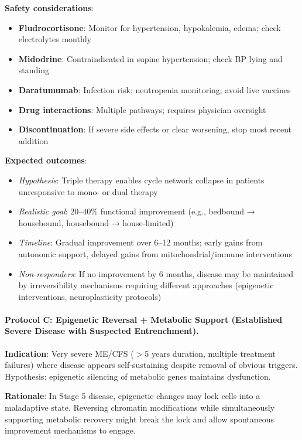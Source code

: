 \textbf{Safety considerations}:
\begin{itemize}
    \item \textbf{Fludrocortisone}: Monitor for hypertension, hypokalemia, edema; check electrolytes monthly
    \item \textbf{Midodrine}: Contraindicated in supine hypertension; check BP lying and standing
    \item \textbf{Daratumumab}: Infection risk; neutropenia monitoring; avoid live vaccines
    \item \textbf{Drug interactions}: Multiple pathways; requires physician oversight
    \item \textbf{Discontinuation}: If severe side effects or clear worsening, stop most recent addition
\end{itemize}

\textbf{Expected outcomes}:
\begin{itemize}
    \item \textit{Hypothesis}: Triple therapy enables cycle network collapse in patients unresponsive to mono- or dual therapy
    \item \textit{Realistic goal}: 20--40\% functional improvement (e.g., bedbound → housebound, housebound → house-limited)
    \item \textit{Timeline}: Gradual improvement over 6--12 months; early gains from autonomic support, delayed gains from mitochondrial/immune interventions
    \item \textit{Non-responders}: If no improvement by 6 months, disease may be maintained by irreversibility mechanisms requiring different approaches (epigenetic interventions, neuroplasticity protocols)
\end{itemize}

\paragraph{Protocol C: Epigenetic Reversal + Metabolic Support (Established Severe Disease with Suspected Entrenchment).}

\textbf{Indication}: Very severe ME/CFS ($>$5 years duration, multiple treatment failures) where disease appears self-sustaining despite removal of obvious triggers. Hypothesis: epigenetic silencing of metabolic genes maintains dysfunction.

\textbf{Rationale}: In Stage 5 disease, epigenetic changes may lock cells into a maladaptive state. Reversing chromatin modifications while simultaneously supporting metabolic recovery might break the lock and allow spontaneous improvement mechanisms to engage.

